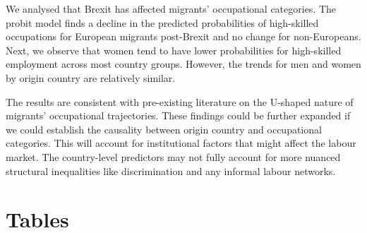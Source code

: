 \documentclass[12pt, a4paper]{article}
\begin{document}
We analysed that Brexit has affected migrants' occupational categories. The probit model finds a decline in the predicted probabilities of high-skilled occupations for European migrants post-Brexit and no change for non-Europeans. Next, we observe that women tend to have lower probabilities for high-skilled employment across most country groups. However, the trends for men and women by origin country are relatively similar. 

The results are consistent with pre-existing literature on the U-shaped nature of migrants' occupational trajectories. These findings could be further expanded if we could establish the causality between origin country and occupational categories. This will account for institutional factors that might affect the labour market. The country-level predictors may not fully account for more nuanced structural inequalities like discrimination and any informal labour networks.




\clearpage




\appendix

\section{Tables}
\end{document}
